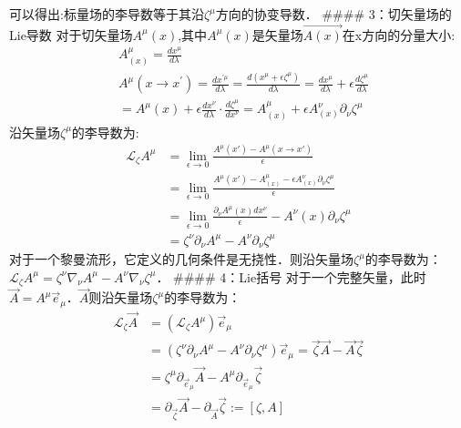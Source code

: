可以得出:标量场的李导数等于其沿$\zeta^{\mu}$方向的协变导数．
#### 3：切矢量场的Lie导数
对于切矢量场$A^{\mu}(x)$,其中$A^{\mu}(x)$是矢量场$\overrightarrow{A(x)}$在x方向的分量大小:
$$\begin{aligned}
&A^{\mu}_{(x)}=\frac{d x^{\mu}}{d \lambda}\\
&A^{\mu}\left(x \rightarrow x^{\prime}\right)=\frac{d x^{\prime \mu}}{d \lambda}=\frac{d\left(x^{\mu}+\epsilon \zeta^{\mu}\right)}{d \lambda}=\frac{d x^{\mu}}{d \lambda}+\epsilon\frac{d \zeta^{\mu}}{d \lambda} \\
&=A^{\mu}(x)+\epsilon \frac{d x^{\nu}}{d \lambda} \cdot \frac{d \zeta^{\mu}}{dx^{\nu}} =A^{\mu}_{(x)}+\epsilon A_{(x)}^{\nu}\partial_{\nu}\zeta^{\mu}
\end{aligned}$$
沿矢量场$\zeta^{\mu}$的李导数为:
$$\begin{aligned}
\mathcal{L}_{\zeta} A^{\mu} &=\lim _{\epsilon \rightarrow 0} \frac{A^{\mu}(x')-A^{\mu}(x \rightarrow x')}{\epsilon} \\
&=\lim _{\epsilon \rightarrow 0} \frac{A^{\mu}(x')-A^{\mu}_{(x)}-\epsilon A_{(x)}^{\nu}\partial_{\nu}\zeta^{\mu}}{\epsilon} \\
&=\lim _{\epsilon \rightarrow 0} \frac{\partial_{\nu} A^{\mu}(x) d x^{\nu}}{\epsilon}-A^{\nu}(x) \partial_{\nu} \zeta^{\mu} \\
&=\zeta^{\nu} \partial_{\nu} A^{\mu}-A^{\nu} \partial_{\nu} \zeta^{\mu}
\end{aligned}$$
对于一个黎曼流形，它定义的几何条件是无挠性．则沿矢量场$\zeta^{\mu}$的李导数为：$\mathcal{L}_{\zeta} A^{\mu}=\zeta^{\nu} \nabla_{\nu} A^{\mu}-A^{\nu} \nabla_{\nu} \zeta^{\mu}$．
#### 4：Lie括号
对于一个完整矢量，此时$\overrightarrow{A}=A^{\mu}\overrightarrow{e}_{\mu}$．$\overrightarrow{A}$则沿矢量场$\zeta^{\mu}$的李导数为：
$$\begin{aligned}
\mathcal{L}_{\zeta} \overrightarrow{A} &=\left(\mathcal{L}_{\zeta} A^{\mu}\right)\overrightarrow{e}_{\mu}  \\
&=\left(\zeta^{\nu} \partial_{\nu} A^{\mu}-A^{\nu} \partial_{\nu} \zeta^{\mu}\right) \overrightarrow{e}_{\mu} =\overrightarrow{\zeta} \overrightarrow{A}-\overrightarrow{A} \overrightarrow{\zeta} \\
&=\zeta^{\mu} \partial_{\overrightarrow{e}_{\mu}} \overrightarrow{A}-A^{\mu} \partial_{\overrightarrow{e}_{\mu}} \overrightarrow{\zeta}\\
&=\partial_{\overrightarrow{\zeta}} \overrightarrow{A}-\partial_{\overrightarrow{A}} \overrightarrow{\zeta}:=[\zeta, A]
\end{aligned}$$
